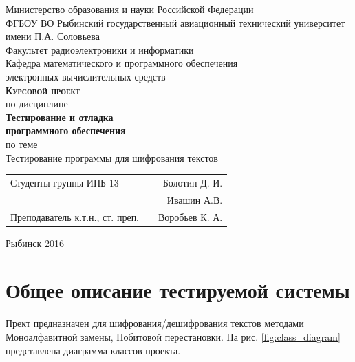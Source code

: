 \documentclass[a4paper,12pt]{article}
\begin{document}
\begin{titlepage}
\newpage


\begin{center}
	\large		
   	Министерство образования и науки Российской Федерации\\[0.5cm]
    	
	ФГБОУ ВО Рыбинский государственный авиационный технический университет имени П.А. Соловьева\\[1.0cm]

	Факультет радиоэлектроники и информатики\\[0.25cm]
		
	Кафедра математического и программного обеспечения\\ электронных вычислительных средств\\[1.5cm]
	
	\Large
	\textbf{\textsc{Курсовой проект}}\\[0.25cm]
	по  дисциплине\\
	\textbf{Тестирование и отладка\\ программного обеспечения}\\[0.5cm]
	
	по теме\\
	Тестирование программы для шифрования текстов
	
\end{center}

\vfill	
\begin{tabularx}{0.95\textwidth}{lXr}
Студенты группы ИПБ-13 			& &	Болотин Д. И.\\
								& &	Ивашин А.В. \\
Преподаватель к.т.н., ст. преп.	& & Воробьев К. А.\\
\end{tabularx}

\vspace{1.5cm}
\center Рыбинск 2016
\end{titlepage}	


\newpage
\setcounter{page}{2}

\tableofcontents

\newpage\section{Общее описание тестируемой системы}

Прект предназначен для шифрования/дешифрования текстов методами Моноалфавитной замены, Побитовой перестановки.
На рис. \ref{fig:class_diagram} представлена  диаграмма классов проекта.
\end{document}
